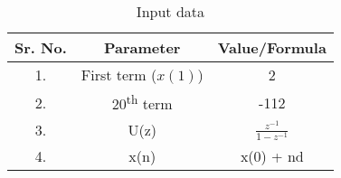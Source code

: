 \begin{table}[h]
    \centering
    \begin{tabular}{|c|c|c|}
        \hline
        \textbf{Sr. No.} & \textbf{Parameter} & \textbf{Value/Formula} \\
        \hline
        1. & First term (\(x(1)\)) & 2 \\
        \hline
        2. & 20\textsuperscript{th} term & -112\\
        \hline
        3. & U(z) & $\frac{z^{-1}}{1-z^{-1}}$\\
        \hline
        4. & x(n) & x(0) + nd\\
        \hline
    \end{tabular}
    \caption{Input data}
  \label{input data}
\end{table}
